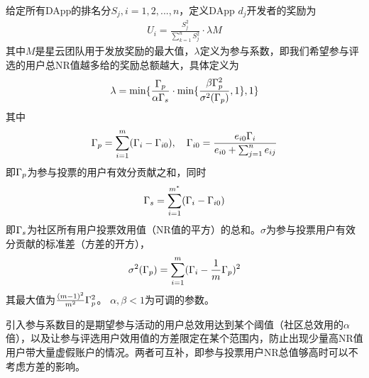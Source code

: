 给定所有DApp的排名分$S_j,i=1,2,...,n$，定义DApp $d_j$开发者的奖励为
\begin{align}
\label{eq:distribution}
U_i = \frac{S_j^2}{\sum_{k=1}^n S_j^2}\cdot \lambda M
\end{align}
其中$M$是星云团队用于发放奖励的最大值，$\lambda $定义为参与系数，即我们希望参与评选的用户总NR值越多给的奖励总额越大，具体定义为
\begin{align}
\lambda=\min\{\frac{\Gamma_p}{\alpha \Gamma_s }\cdot \min\{\frac{\beta\Gamma_p^2 }{\sigma^2(\Gamma_p)},1\},1\}
\end{align}
其中$$\Gamma_p = \sum_{i=1}^m (\Gamma_i-\Gamma_{i0}),~~~\Gamma_{i0} = \frac{e_{i0}\Gamma_i}{e_{i0}+\sum_{j=1}^n {e_{ij}}}$$
即$\Gamma_p$为参与投票的用户有效分贡献之和，同时$$\Gamma_s = \sum_{i=1}^{m^*} (\Gamma_i-\Gamma_{i0})$$即$\Gamma_s$为社区所有用户投票效用值（NR值的平方）的总和。$\sigma$为参与投票用户有效分贡献的标准差（方差的开方），
$$ \sigma^2(\Gamma_p) = \sum_{i=1}^m (\Gamma_i-\frac{1}{m}\Gamma_p)^2 $$
其最大值为$\frac{(m-1)^2}{m^2}\Gamma_p^2$。
$\alpha,\beta<1$为可调的参数。

引入参与系数目的是期望参与活动的用户总效用达到某个阈值（社区总效用的$\alpha$倍），以及让参与评选用户效用值的方差限定在某个范围内，防止出现少量高NR值用户带大量虚假账户的情况。两者可互补，即参与投票用户NR总值够高时可以不考虑方差的影响。

